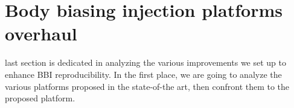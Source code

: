 
\section{Body biasing injection platforms overhaul}
 last section is dedicated in analyzing the various improvements we set up to enhance BBI reproducibility.
In the first place, we are going to analyze the various platforms proposed in the state-of-the art, then confront them to the proposed platform.
